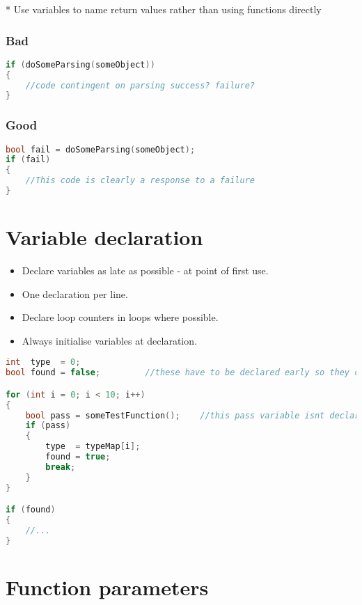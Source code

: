 * Use variables to name return values rather than using functions directly

\subsubsection{Bad}

\begin{lstlisting}[language=c++]
if (doSomeParsing(someObject))
{
    //code contingent on parsing success? failure?
}
\end{lstlisting}

\subsubsection{Good}
\begin{lstlisting}[language=c++]
bool fail = doSomeParsing(someObject);
if (fail)
{
    //This code is clearly a response to a failure
}
\end{lstlisting}

\section{Variable declaration}

\begin{itemize}
\item Declare variables as late as possible - at point of first use.
\item One declaration per line.
\item Declare loop counters in loops where possible.
\item Always initialise variables at declaration.
\end{itemize}

\begin{lstlisting}[language=c++]
int  type  = 0;
bool found = false;         //these have to be declared early so they can be used after the for loop

for (int i = 0; i < 10; i++)
{
    bool pass = someTestFunction();    //this pass variable isnt declared until it's used - good
    if (pass)
    {
        type  = typeMap[i];
        found = true;
        break;
    }
}

if (found)
{
    //...
}    
\end{lstlisting}

\section{Function parameters}

